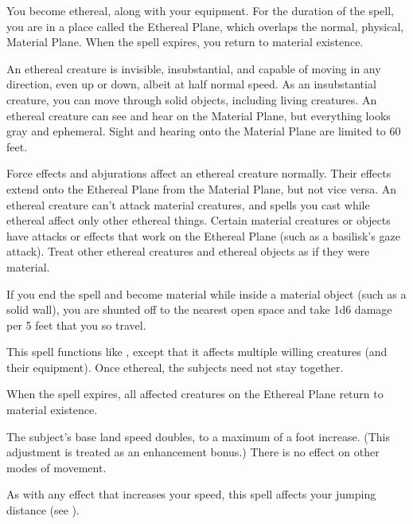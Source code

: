 \spellrng{\rngpers}
\begin{spelleffect}
  You become ethereal, along with your equipment. For the duration of the spell, you are in a place called the Ethereal Plane, which overlaps the normal, physical, Material Plane. When the spell expires, you return to material existence.
  \par An ethereal creature is invisible, insubstantial, and capable of moving in any direction, even up or down, albeit at half normal speed. As an insubstantial creature, you can move through solid objects, including living creatures. An ethereal creature can see and hear on the Material Plane, but everything looks gray and ephemeral. Sight and hearing onto the Material Plane are limited to 60 feet.
  \par Force effects and abjurations affect an ethereal creature normally. Their effects extend onto the Ethereal Plane from the Material Plane, but not vice versa. An ethereal creature can't attack material creatures, and spells you cast while ethereal affect only other ethereal things. Certain material creatures or objects have attacks or effects that work on the Ethereal Plane (such as a basilisk's gaze attack). Treat other ethereal creatures and ethereal objects as if they were material. 
  \par If you end the spell and become material while inside a material object (such as a solid wall), you are shunted off to the nearest open space and take 1d6 damage per 5 feet that you so travel.
\end{spelleffect}

\begin{spelleffect}
  This spell functions like , except that it affects multiple willing creatures (and their equipment). Once ethereal, the subjects need not stay together.
\end{spelleffect}
\begin{spellnotes}
  When the spell expires, all affected creatures on the Ethereal Plane return to material existence.
\end{spellnotes}

\spellrng{\rngclose}
\begin{spelleffect}
    The subject's base land speed doubles, to a maximum of a  foot increase. (This adjustment is treated as an enhancement bonus.) There is no effect on other modes of movement.
\end{spelleffect}
\begin{spellnotes}
    As with any effect that increases your speed, this spell affects your jumping distance (see ).
\end{spellnotes}

